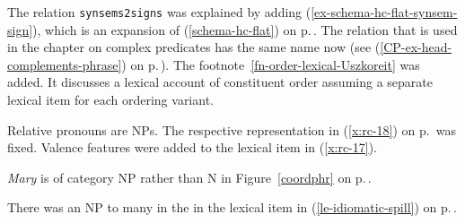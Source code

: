 The relation \texttt{synsems2signs} was explained by adding (\ref{ex-schema-hc-flat-synsem-sign}),
which is an expansion of (\ref{schema-hc-flat}) on p.\,\pageref{schema-hc-flat}. The relation that
is used in the chapter on complex predicates has the same name now (see
(\ref{CP-ex-head-complements-phrase}) on p.\,\pageref{CP-ex-head-complements-phrase}). The
footnote~\ref{fn-order-lexical-Uszkoreit} was added. It discusses a lexical account of constituent
order assuming a separate lexical item for each ordering variant.

Relative pronouns are NPs. The respective representation in (\ref{x:rc-18}) on p.\,\pageref{x:rc-18}
was fixed. Valence features were added to the lexical item in (\ref{x:rc-17}).

\emph{Mary} is of category NP rather than N in Figure~\ref{coordphr} on p.\,\pageref{coordphr}. 

There was an NP to many in the \compsl in the lexical item in (\ref{le-idiomatic-spill}) on
p.\,\pageref{le-idiomatic-spill}.










%
%
%


